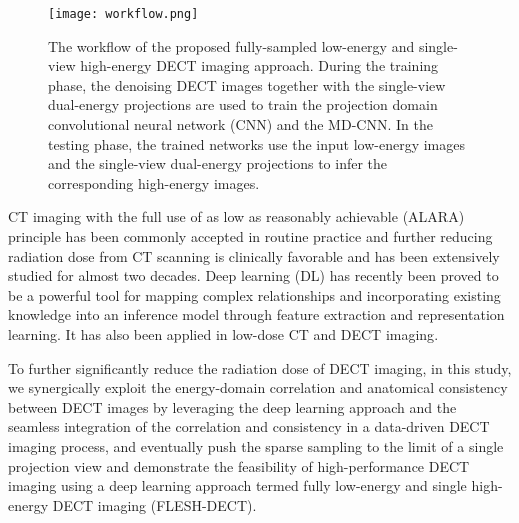 \documentclass[journal,twoside,web]{ieeecolor}
\begin{document}
\begin{figure*}[t]%
    \centering
        \texttt{[image: workflow.png]}
        \caption{The workflow of the proposed fully-sampled low-energy and single-view high-energy DECT imaging approach. During the training phase, the denoising DECT images together with the single-view dual-energy projections are used to train the projection domain convolutional neural network (CNN) and the MD-CNN. In the testing phase, the trained networks use the input low-energy images and the single-view dual-energy projections to infer the corresponding high-energy images.}
    \label{fig:1}
\end{figure*}

CT imaging with the full use of as low as reasonably achievable (ALARA) principle has been commonly accepted in routine practice and further reducing radiation dose from CT scanning is clinically favorable and has been extensively studied for almost two decades. Deep learning (DL) has recently been proved to be a powerful tool for mapping complex relationships and incorporating existing knowledge into an inference model through feature extraction and representation learning\cite{ref28, ref29, ref30, ref31, ref32, ref33, ref34, ref35, ref36, ref37}. It has also been applied in low-dose CT\cite{ref38, ref39, ref40, ref41} and DECT imaging\cite{ref42, ref43, ref44, ref45, ref46}.

To further significantly reduce the radiation dose of DECT imaging, in this study, we synergically exploit the energy-domain correlation and anatomical consistency between DECT images by leveraging the deep learning approach and the seamless integration of the correlation and consistency in a data-driven DECT imaging process, and eventually push the sparse sampling to the limit of a single projection view and demonstrate the feasibility of high-performance DECT imaging using a deep learning approach termed fully low-energy and single high-energy DECT imaging (FLESH-DECT).

\end{document}
